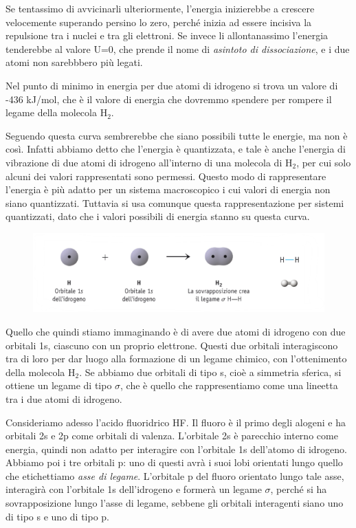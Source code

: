 Se tentassimo di avvicinarli ulteriormente, l'energia inizierebbe a crescere velocemente superando persino lo zero, perché inizia ad essere incisiva la repulsione tra i nuclei e tra gli elettroni. Se invece li allontanassimo l'energia tenderebbe al valore U=0, che prende il nome di \textit{asintoto di dissociazione}, e i due atomi non sarebbbero più legati.

Nel punto di minimo in energia per due atomi di idrogeno si trova un valore di -436 kJ/mol, che è il valore di energia che dovremmo spendere per rompere il legame della molecola H$_2$.

\vspace{0.2cm}
Seguendo questa curva sembrerebbe che siano possibili tutte le energie, ma non è così. Infatti abbiamo detto che l'energia è quantizzata, e tale è anche l'energia di vibrazione di due atomi di idrogeno all'interno di una molecola di H$_2$, per cui solo alcuni dei valori rappresentati sono permessi. Questo modo di rappresentare l'energia è più adatto per un sistema macroscopico i cui valori di energia non siano quantizzati. Tuttavia si usa comunque questa rappresentazione per sistemi quantizzati, dato che i valori possibili di energia stanno su questa curva.

\vspace{-0.5cm}\begin{figure}[htp]
    \centering
    \includegraphics[width=12cm]{immagini/legame-H_2.png}
\end{figure}

\vspace{-0.5cm}Quello che quindi stiamo immaginando è di avere due atomi di idrogeno con due orbitali 1s, ciascuno con un proprio elettrone. Questi due orbitali interagiscono tra di loro per dar luogo alla formazione di un legame chimico, con l'ottenimento della molecola H$_2$. Se abbiamo due orbitali di tipo s, cioè a simmetria sferica, si ottiene un legame di tipo $\sigma$, che è quello che rappresentiamo come una lineetta tra i due atomi di idrogeno. 

\vspace{0.2cm}Consideriamo adesso l'acido fluoridrico HF. Il fluoro è il primo degli alogeni e ha orbitali 2s e 2p come orbitali di valenza. L'orbitale 2s è parecchio interno come energia, quindi non adatto per interagire con l'orbitale 1s dell'atomo di idrogeno. Abbiamo poi i tre orbitali p: uno di questi avrà i suoi lobi orientati lungo quello che etichettiamo \textit{asse di legame}. L'orbitale p del fluoro orientato lungo tale asse, interagirà con l'orbitale 1s dell'idrogeno e formerà un legame $\sigma$, perché si ha sovrapposizione lungo l'asse di legame, sebbene gli orbitali interagenti siano uno di tipo s e uno di tipo p.

